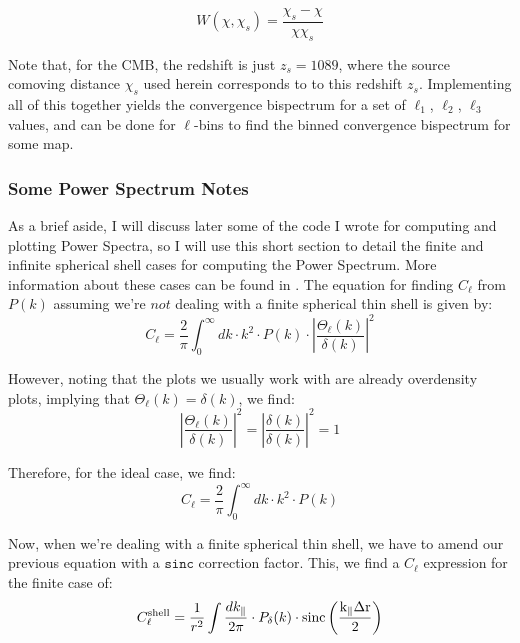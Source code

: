 \documentclass[11pt]{article}
\renewcommand{\_}[1]{\underline{ #1 }}
\newcommand{\npar}{\vspace{.3cm}\newline}
\begin{document}
{\begin{equation}
    W(\chi, \chi_s) = \frac{\chi_s - \chi}{\chi\chi_s}
\end{equation}

Note that, for the CMB, the redshift is just $z_s = 1089$, where the source comoving distance $\chi_s$ used herein corresponds to to this redshift $z_s$. Implementing all of this together yields the convergence bispectrum for a set of $\ell_1$, $\ell_2$, $\ell_3$ values, and can be done for $\ell$-bins to find the binned convergence bispectrum for some map.

\subsubsection{Some Power Spectrum Notes}\label{powerspecnotes}

As a brief aside, I will discuss later some of the code I wrote for computing and plotting Power Spectra, so I will use this short section to detail the finite and infinite spherical shell cases for computing the Power Spectrum. More information about these cases can be found in \cite{Takahashi_2017}.
\npar
The equation for finding $C_{\ell}$ from $P(k)$ assuming we're $\textit{not}$ dealing with a finite spherical thin shell is given by:
\begin{equation}
    C_{\ell} = \frac{2}{\pi}\int_0^{\infty} dk\cdot k^2\cdot P(k)\cdot \left|\frac{\Theta_{\ell}(k)}{\delta(k)} \right|^2
\end{equation}

However, noting that the plots we usually work with are already overdensity plots, implying that $\Theta_{\ell}(k)=\delta(k)$, we find:
\begin{equation}
    \left| \frac{\Theta_{\ell}(k)}{\delta(k)}\right|^2 = \left|\frac{\delta(k)}{\delta(k)}\right|^2 = 1
\end{equation}

Therefore, for the ideal case, we find:
\begin{equation}
    C_{\ell} = \frac{2}{\pi}\int_0^{\infty} dk\cdot k^2\cdot P(k)
\end{equation}

Now, when we're dealing with a finite spherical thin shell, we have to amend our previous equation with a $\texttt{sinc}$ correction factor. This, we find a $C_{\ell}$ expression for the finite case of:
\begin{equation}
    C_{\ell}^{\text{shell}} = \frac1{r^2} \int \frac{dk_{\parallel}}{2\pi}\cdot P_{\delta}(k)\cdot \rm{sinc}\left(\frac{k_{\parallel}\Delta r}{2}\right)
\end{equation}

}
\end{document}

